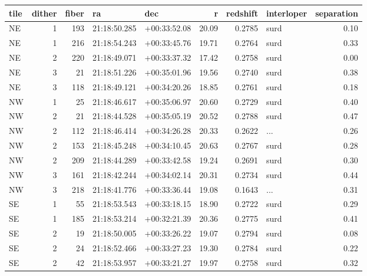 \begin{tabular}{lrrllrrlr}
\toprule
tile &  dither &  fiber &            ra &           dec &      r &  redshift & interloper &  separation \\
\midrule
  NE &       1 &    193 &  21:18:50.285 &  +00:33:52.08 &  20.09 &    0.2785 &       surd &        0.10 \\
  NE &       1 &    216 &  21:18:54.243 &  +00:33:45.76 &  19.71 &    0.2764 &       surd &        0.33 \\
  NE &       2 &    220 &  21:18:49.071 &  +00:33:37.32 &  17.42 &    0.2758 &       surd &        0.00 \\
  NE &       3 &     21 &  21:18:51.226 &  +00:35:01.96 &  19.56 &    0.2740 &       surd &        0.38 \\
  NE &       3 &    118 &  21:18:49.121 &  +00:34:20.26 &  18.85 &    0.2761 &       surd &        0.18 \\
  NW &       1 &     25 &  21:18:46.617 &  +00:35:06.97 &  20.60 &    0.2729 &       surd &        0.40 \\
  NW &       2 &     21 &  21:18:44.528 &  +00:35:05.19 &  20.52 &    0.2788 &       surd &        0.47 \\
  NW &       2 &    112 &  21:18:46.414 &  +00:34:26.28 &  20.33 &    0.2622 &        ... &        0.26 \\
  NW &       2 &    153 &  21:18:45.248 &  +00:34:10.45 &  20.63 &    0.2767 &       surd &        0.28 \\
  NW &       2 &    209 &  21:18:44.289 &  +00:33:42.58 &  19.24 &    0.2691 &       surd &        0.30 \\
  NW &       3 &    161 &  21:18:42.244 &  +00:34:02.14 &  20.31 &    0.2734 &       surd &        0.44 \\
  NW &       3 &    218 &  21:18:41.776 &  +00:33:36.44 &  19.08 &    0.1643 &        ... &        0.31 \\
  SE &       1 &     55 &  21:18:53.543 &  +00:33:18.15 &  18.90 &    0.2722 &       surd &        0.29 \\
  SE &       1 &    185 &  21:18:53.214 &  +00:32:21.39 &  20.36 &    0.2775 &       surd &        0.41 \\
  SE &       2 &     19 &  21:18:50.005 &  +00:33:26.22 &  19.07 &    0.2794 &       surd &        0.08 \\
  SE &       2 &     24 &  21:18:52.466 &  +00:33:27.23 &  19.30 &    0.2784 &       surd &        0.22 \\
  SE &       2 &     42 &  21:18:53.957 &  +00:33:21.27 &  19.97 &    0.2758 &       surd &        0.32 \\

\end{tabular}

